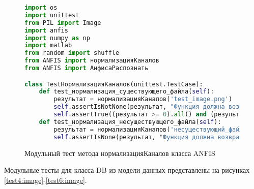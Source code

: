 \begin{figure}[ht]
\begin{lstlisting}[language=Python]
import os
import unittest
from PIL import Image
import anfis
import numpy as np
import matlab
from random import shuffle
from ANFIS import нормализацияКаналов
from ANFIS import АнфисаРаспознать

class TestНормализацияКаналов(unittest.TestCase):
    def test_нормализация_существующего_файла(self):
        результат = нормализацияКаналов('test_image.png')
        self.assertIsNotNone(результат, "Функция должна возвращать не None для существующего файла")
        self.assertTrue((результат >= 0).all() and (результат <= 1).all(), "Все значения должны быть в диапазоне от 0 до 1")
    def test_нормализация_несуществующего_файла(self):
        результат = нормализацияКаналов('несуществующий_файл.jpg')
        self.assertIsNone(результат, "Функция должна возвращать None для несуществующего файла")
\end{lstlisting}  
\caption{Модульный тест метода нормализацияКаналов класса ANFIS}
\label{test3:image}
\end{figure}

Модульные тесты для класса DB из модели данных представлены на рисунках \ref{test4:image}-\ref{test6:image}.

